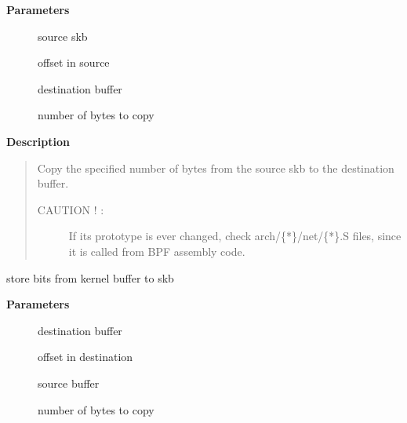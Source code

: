 \documentclass[a4paper,8pt,english]{sphinxmanual}
\begin{document}
\textbf{Parameters}
\begin{description}
\item[{}] \leavevmode
source skb

\item[{}] \leavevmode
offset in source

\item[{}] \leavevmode
destination buffer

\item[{}] \leavevmode
number of bytes to copy

\end{description}

\textbf{Description}
\begin{quote}

Copy the specified number of bytes from the source skb to the
destination buffer.
\begin{description}
\item[{CAUTION ! :}] \leavevmode
If its prototype is ever changed,
check arch/\{*\}/net/\{*\}.S files,
since it is called from BPF assembly code.

\end{description}
\end{quote}

\begin{fulllineitems}
\label{networking/kapi:c.skb_store_bits}
store bits from kernel buffer to skb

\end{fulllineitems}


\textbf{Parameters}
\begin{description}
\item[{}] \leavevmode
destination buffer

\item[{}] \leavevmode
offset in destination

\item[{}] \leavevmode
source buffer

\item[{}] \leavevmode
number of bytes to copy

\end{description}
\end{document}
